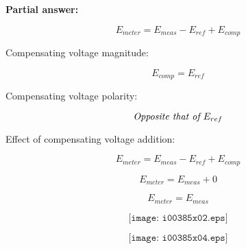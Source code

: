 
\noindent
{\bf Partial answer:}

$$E_{meter} = E_{meas} - E_{ref} + E_{comp}$$







Compensating voltage magnitude:

$$E_{comp} = E_{ref}$$

\vskip 10pt

Compensating voltage polarity:

$$\hbox{\it Opposite that of }E_{ref}$$

\vskip 10pt

Effect of compensating voltage addition:

$$E_{meter} = E_{meas} - E_{ref} + E_{comp}$$

$$E_{meter} = E_{meas} + 0$$

$$E_{meter} = E_{meas}$$


$$\texttt{[image: i00385x02.eps]}$$

$$\texttt{[image: i00385x04.eps]}$$




